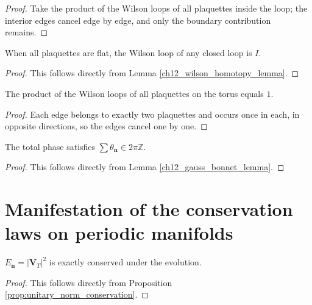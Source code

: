 \begin{proof}
Take the product of the Wilson loops of all plaquettes inside the loop; the interior edges cancel edge by edge, and only the boundary contribution remains.
\end{proof}

\begin{corollary}\label{ch12_wilson_flat_corollary}
When all plaquettes are flat, the Wilson loop of any closed loop is $I$.
\end{corollary}

\begin{proof}
This follows directly from Lemma \ref{ch12_wilson_homotopy_lemma}.
\end{proof}

\begin{lemma}\label{ch12_gauss_bonnet_lemma}
The product of the Wilson loops of all plaquettes on the torus equals $1$.
\end{lemma}

\begin{proof}
Each edge belongs to exactly two plaquettes and occurs once in each, in opposite directions, so the edges cancel one by one.
\end{proof}

\begin{corollary}\label{ch12_gauss_bonnet_corollary}
The total phase satisfies $\sum\theta_{\mathbf{n}}\in 2\pi\mathbb{Z}$.
\end{corollary}

\begin{proof}
This follows directly from Lemma \ref{ch12_gauss_bonnet_lemma}.
\end{proof}

\section{Manifestation of the conservation laws on periodic manifolds}\label{sec:conservation_periodic_manifolds}

\begin{proposition}\label{prop:lattice_energy_conservation}
$E_{\mathbf{n}}=|\mathbf{V}_T|^2$ is exactly conserved under the evolution.
\end{proposition}

\begin{proof}
This follows directly from Proposition \ref{prop:unitary_norm_conservation}.
\end{proof}

